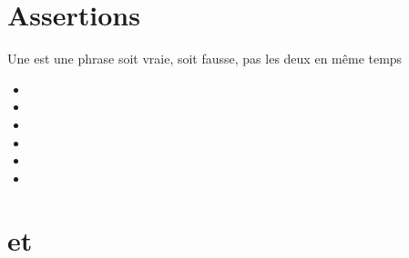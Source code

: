 
\section{Assertions}

\begin{frame}
Une  est une phrase soit vraie, soit fausse, pas les deux en même temps

\pause
\bigskip
\begin{itemize}
  \item<2-> 
  \item<2-> 
  \item<3-> 
  \item<3-> 
  \item<4-> 
  \item<4-> 
\end{itemize}
\end{frame}





\section{\og et\fg}


